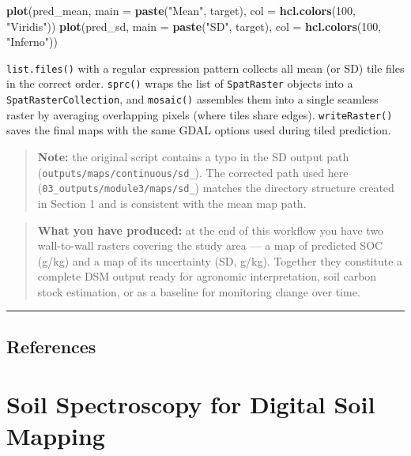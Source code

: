 \documentclass[
  10pt,
  b5paper,
  oneside]{book}
\newenvironment{Shaded}{\begin{snugshade}}{\end{snugshade}}
\newcommand{\AttributeTok}[1]{\textcolor[rgb]{0.13,0.29,0.53}{#1}}
\newcommand{\DecValTok}[1]{\textcolor[rgb]{0.00,0.00,0.81}{#1}}
\newcommand{\FunctionTok}[1]{\textcolor[rgb]{0.13,0.29,0.53}{\textbf{#1}}}
\newcommand{\NormalTok}[1]{#1}
\newcommand{\StringTok}[1]{\textcolor[rgb]{0.31,0.60,0.02}{#1}}
\begin{document}
\begin{Shaded}
\begin{Highlighting}[]
\FunctionTok{plot}\NormalTok{(pred\_mean, }\AttributeTok{main =} \FunctionTok{paste}\NormalTok{(}\StringTok{"Mean"}\NormalTok{, target), }\AttributeTok{col =} \FunctionTok{hcl.colors}\NormalTok{(}\DecValTok{100}\NormalTok{, }\StringTok{"Viridis"}\NormalTok{))}
\FunctionTok{plot}\NormalTok{(pred\_sd,   }\AttributeTok{main =} \FunctionTok{paste}\NormalTok{(}\StringTok{"SD"}\NormalTok{,   target), }\AttributeTok{col =} \FunctionTok{hcl.colors}\NormalTok{(}\DecValTok{100}\NormalTok{, }\StringTok{"Inferno"}\NormalTok{))}
\end{Highlighting}
\end{Shaded}

\texttt{list.files()} with a regular expression pattern collects all mean (or SD) tile files in the correct order. \texttt{sprc()} wraps the list of \texttt{SpatRaster} objects into a \texttt{SpatRasterCollection}, and \texttt{mosaic()} assembles them into a single seamless raster by averaging overlapping pixels (where tiles share edges). \texttt{writeRaster()} saves the final maps with the same GDAL options used during tiled prediction.

\begin{quote}
\textbf{Note:} the original script contains a typo in the SD output path (\texttt{outputs/maps/continuous/sd\_}). The corrected path used here (\texttt{03\_outputs/module3/maps/sd\_}) matches the directory structure created in Section 1 and is consistent with the mean map path.
\end{quote}

\begin{quote}
\textbf{What you have produced:} at the end of this workflow you have two wall-to-wall rasters covering the study area --- a map of predicted SOC (g/kg) and a map of its uncertainty (SD, g/kg). Together they constitute a complete DSM output ready for agronomic interpretation, soil carbon stock estimation, or as a baseline for monitoring change over time.
\end{quote}

\begin{center}\rule{0.5\linewidth}{0.5pt}\end{center}

\section*{References}\label{references-3}

\chapter{Soil Spectroscopy for Digital Soil Mapping}\label{soil-spectroscopy-for-digital-soil-mapping}
\end{document}
